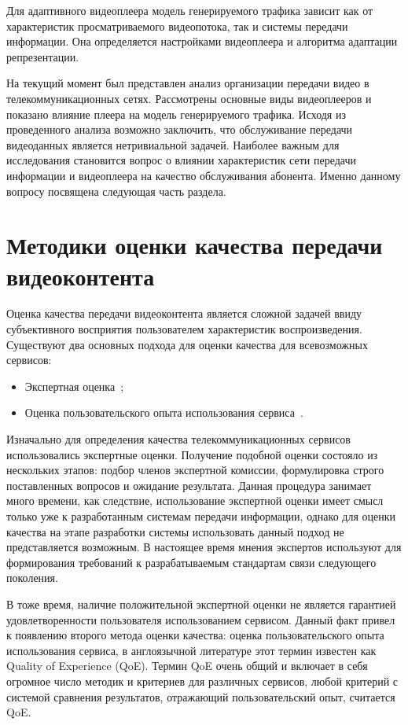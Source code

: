Для адаптивного видеоплеера модель генерируемого трафика зависит как от характеристик просматриваемого видеопотока, так и системы передачи информации. Она определяется настройками видеоплеера и алгоритма адаптации репрезентации.

На текущий момент был представлен анализ организации передачи видео в телекоммуникационных сетях. Рассмотрены основные виды видеоплееров и показано влияние плеера на модель генерируемого трафика. Исходя из проведенного анализа возможно заключить, что обслуживание передачи видеоданных является нетривиальной задачей. Наиболее важным для исследования становится вопрос о влиянии характеристик сети передачи информации и видеоплеера на качество обслуживания абонента. Именно данному вопросу посвящена следующая часть раздела.

\section{Методики оценки качества передачи видеоконтента}
\label{chap1:VideoMOS}

Оценка качества передачи видеоконтента является сложной задачей ввиду субъективного восприятия пользователем характеристик воспроизведения. Существуют два основных подхода для оценки качества для всевозможных сервисов:
\begin{itemize}
  \item Экспертная оценка~\cite{Experts};
  \item Оценка пользовательского опыта использования сервиса~\cite{QoE}.
\end{itemize}

Изначально для определения качества телекоммуникационных сервисов использовались экспертные оценки. Получение подобной оценки состояло из нескольких этапов: подбор членов экспертной комиссии, формулировка строго поставленных вопросов и ожидание результата. Данная процедура занимает много времени, как следствие, использование экспертной оценки имеет смысл только уже к разработанным системам передачи информации, однако для оценки качества на этапе разработки системы использовать данный подход не представляется возможным. В настоящее время мнения экспертов используют для формирования требований к разрабатываемым стандартам связи следующего поколения.

В тоже время, наличие положительной экспертной оценки не является гарантией удовлетворенности пользователя использованием сервисом. Данный факт привел к появлению второго метода оценки качества: оценка пользовательского опыта использования сервиса, в англоязычной литературе этот термин известен как Quality of Experience (QoE). Термин QoE очень общий и включает в себя огромное число методик и критериев для различных сервисов, любой критерий с системой сравнения результатов, отражающий пользовательский опыт, считается QoE.

